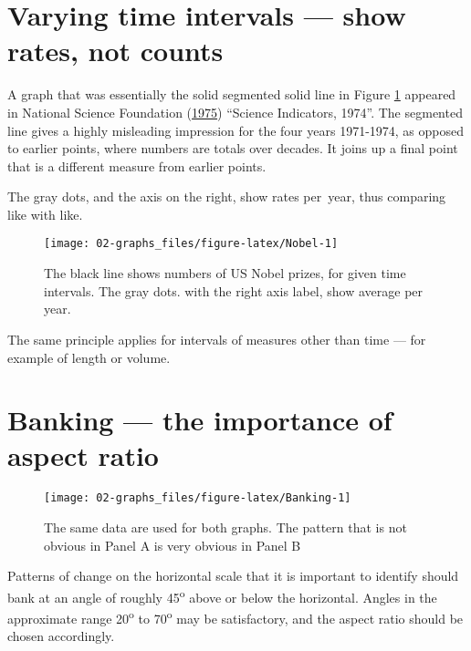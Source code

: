 \documentclass[
  10ptls,
  b5paper]{book}
\begin{document}
\hypertarget{varying-time-intervals-show-rates-not-counts}{%
\section{Varying time intervals --- show rates, not counts}\label{varying-time-intervals-show-rates-not-counts}}

A graph that was essentially the solid segmented solid line in
Figure \ref{fig:Nobel} appeared in National Science Foundation (\protect\hyperlink{ref-national1975science}{1975})
``Science Indicators, 1974''. The segmented line gives
a highly misleading impression for the four years 1971-1974, as
opposed to earlier points, where numbers are totals over decades.
It joins up a final point that is a different measure from earlier
points.

The gray dots, and the axis on the right, show rates per~year,
thus comparing like with like.

\begin{figure}[H]

{\centering \texttt{[image: 02-graphs\_files/figure-latex/Nobel-1]} 

}

\caption{The black line shows numbers of US Nobel prizes, for given time intervals. The gray dots. with the right axis label, show average per year.}\label{fig:Nobel}
\end{figure}

The same principle applies for intervals of measures
other than time --- for example of length or volume.

\hypertarget{banking-the-importance-of-aspect-ratio}{%
\section{Banking --- the importance of aspect ratio}\label{banking-the-importance-of-aspect-ratio}}

\begin{figure}[H]

{\centering \texttt{[image: 02-graphs\_files/figure-latex/Banking-1]} 

}

\caption{The same data are used for both graphs.  The pattern that is not
obvious in Panel A is very obvious in Panel B}\label{fig:Banking}
\end{figure}

Patterns of change on the horizontal scale that it is
important to identify should bank at an angle of roughly 45\textsuperscript{o}
above or below the horizontal. Angles in
the approximate range 20\textsuperscript{o} to 70\textsuperscript{o} may be satisfactory,
and the aspect ratio should be chosen accordingly.
\end{document}
